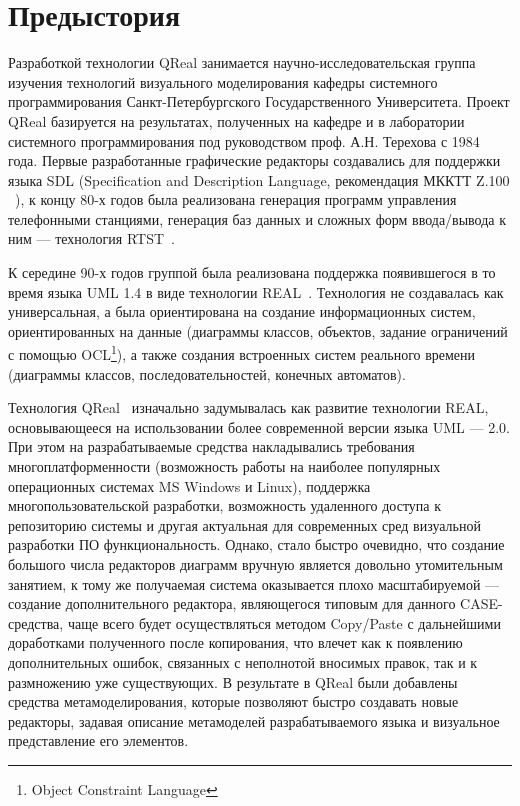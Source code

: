 \documentclass[a4paper]{article}
\begin{document}
\section{Предыстория}

Разработкой технологии QReal занимается научно-исследовательская группа изучения технологий визуального моделирования кафедры системного программирования Санкт-Петербургского Государственного Университета. Проект QReal базируется на результатах, полученных на кафедре и в лаборатории системного программирования под руководством проф. А.Н. Терехова с 1984 года. Первые разработанные графические редакторы создавались для поддержки языка SDL (Specification and Description Language, рекомендация МККТТ Z.100 ~\cite{sdl}), к концу 80-х годов была реализована генерация программ управления телефонными станциями, генерация баз данных и сложных форм ввода/вывода к ним — технология RTST~\cite{rtst}. 

К середине 90-х годов группой была реализована поддержка появившегося в то время языка UML 1.4 в виде технологии REAL~\cite{real}. Технология не создавалась как универсальная, а была ориентирована на создание информационных систем, ориентированных на данные (диаграммы классов, объектов, задание ограничений с помощью OCL\footnote{Object Constraint Language}), а также создания встроенных систем реального времени (диаграммы классов, последовательностей, конечных автоматов). 

Технология QReal~\cite{qreal}  изначально задумывалась как развитие технологии REAL, основывающееся на использовании более современной версии языка UML --- 2.0. При этом на разрабатываемые средства накладывались требования многоплатформенности (возможность работы на наиболее популярных операционных системах MS Windows и Linux), поддержка многопользовательской разработки, возможность удаленного доступа к репозиторию системы и другая актуальная для современных сред визуальной разработки ПО функциональность. Однако, стало быстро очевидно, что создание большого числа редакторов диаграмм вручную является довольно утомительным занятием, к тому же получаемая система оказывается плохо масштабируемой --- создание дополнительного редактора, являющегося типовым для данного CASE-средства, чаще всего будет осуществляться методом Copy/Paste с дальнейшими доработками полученного после копирования, что влечет как к появлению дополнительных ошибок, связанных с неполнотой вносимых правок, так и к размножению уже существующих. В результате в QReal были добавлены средства метамоделирования, которые позволяют быстро создавать новые редакторы, задавая описание метамоделей разрабатываемого языка и визуальное представление его элементов.
\end{document}
